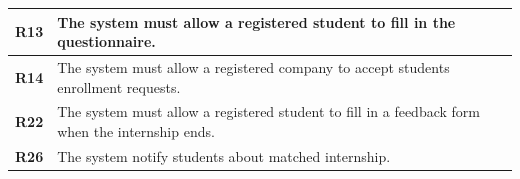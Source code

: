 \begin{table}[H]
\begin{tabular}{|l|m{10cm}|}
        \hline \textbf{R13} & The system must allow a registered student to fill in the questionnaire. \\
        \hline \textbf{R14} & The system must allow a registered company to accept students enrollment requests. \\
        \hline \textbf{R22} & The system must allow a registered student to fill in a feedback form when the internship ends. \\
        \hline \textbf{R26} & The system notify students about matched internship. \\
        \hline
    \end{tabular}
\end{table}



